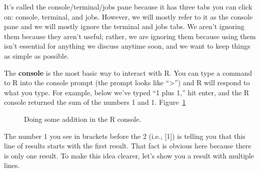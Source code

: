 \documentclass[
  letterpaper,
  DIV=11,
  numbers=noendperiod]{scrreprt}
\begin{document}
It's called the console/terminal/jobs pane because it has three tabs you
can click on: console, terminal, and jobs. However, we will mostly refer
to it as the console pane and we will mostly ignore the terminal and
jobs tabs. We aren't ignoring them because they aren't useful; rather,
we are ignoring them because using them isn't essential for anything we
discuss anytime soon, and we want to keep things as simple as possible.

The \textbf{console} is the most basic way to interact with R. You can
type a command to R into the console prompt (the prompt looks like
``\textgreater{}'') and R will respond to what you type. For example,
below we've typed ``1 plus 1,'' hit enter, and the R console returned
the sum of the numbers 1 and 1. Figure~\ref{fig-one-plus-one}

\begin{figure}


\caption{\label{fig-one-plus-one}Doing some addition in the R console.}

\end{figure}%

The number 1 you see in brackets before the 2 (i.e., {[}1{]}) is telling
you that this line of results starts with the first result. That fact is
obvious here because there is only one result. To make this idea
clearer, let's show you a result with multiple lines.
\end{document}
